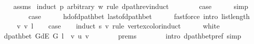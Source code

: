 \begin{isabellebody}
%
\isadelimproof
\ \ %
\endisadelimproof
%
\isatagproof
{}\isamarkupfalse%
\ assms\isanewline
{}\isamarkupfalse%
\ {\isacharparenleft}{\kern0pt}induct\ p\ arbitrary{\isacharcolon}{\kern0pt}\ w\ rule{\isacharcolon}{\kern0pt}\ dpath{\isacharunderscore}{\kern0pt}rev{\isacharunderscore}{\kern0pt}induct{\isacharparenright}{\kern0pt}\isanewline
\ \ \isamarkupfalse%
\ {}\isanewline
\ \ \isamarkupfalse%
\ {\isacharquery}{\kern0pt}case\isanewline
\ \ \ \ \isamarkupfalse%
\ simp\isanewline
{}\isamarkupfalse%
\isanewline
\ \ \isamarkupfalse%
\ {}\isanewline
\ \ \isamarkupfalse%
\ {\isacharquery}{\kern0pt}case\isanewline
\ \ \ \ \isamarkupfalse%
\ hd{\isacharunderscore}{\kern0pt}of{\isacharunderscore}{\kern0pt}dpath{\isacharunderscore}{\kern0pt}bet{\isacharprime}{\kern0pt}\ last{\isacharunderscore}{\kern0pt}of{\isacharunderscore}{\kern0pt}dpath{\isacharunderscore}{\kern0pt}bet\isanewline
\ \ \ \ \isamarkupfalse%
\ {\isacharparenleft}{\kern0pt}fastforce\ intro{\isacharcolon}{\kern0pt}\ list{\isacharunderscore}{\kern0pt}length{\isacharunderscore}{\kern0pt}{}{\isacharparenright}{\kern0pt}\isanewline
{}\isamarkupfalse%
\isanewline
\ \ \isamarkupfalse%
\ {\isacharparenleft}{\kern0pt}{}\ v\ v{\isacharprime}{\kern0pt}\ l{\isacharparenright}{\kern0pt}\isanewline
\ \ \isamarkupfalse%
\ {\isacharquery}{\kern0pt}case\isanewline
\ \ \isamarkupfalse%
\ {\isacharparenleft}{\kern0pt}induct\ s\ v\ rule{\isacharcolon}{\kern0pt}\ vertex{\isacharunderscore}{\kern0pt}color{\isacharunderscore}{\kern0pt}induct{\isacharparenright}{\kern0pt}\isanewline
\ \ \ \ \isamarkupfalse%
\ white\isanewline
\ \ \ \ \isamarkupfalse%
\ {\isachardoublequoteopen}dpath{\isacharunderscore}{\kern0pt}bet\ {\isacharparenleft}{\kern0pt}G{\isachardot}{\kern0pt}dE\ G{\isacharparenright}{\kern0pt}\ {\isacharparenleft}{\kern0pt}l\ {\isacharat}{\kern0pt}\ {\isacharbrackleft}{\kern0pt}v{\isacharbrackright}{\kern0pt}{\isacharparenright}{\kern0pt}\ u\ v{\isachardoublequoteclose}\isanewline
\ \ \ \ \ \ \isamarkupfalse%
\ {\isachardoublequoteopen}{}{\isachardot}{\kern0pt}prems{\isachardoublequoteclose}{\isacharparenleft}{\kern0pt}{}{\isacharparenright}{\kern0pt}\isanewline
\ \ \ \ \ \ \isamarkupfalse%
\ {\isacharparenleft}{\kern0pt}intro\ dpath{\isacharunderscore}{\kern0pt}bet{\isacharunderscore}{\kern0pt}pref{\isacharparenright}{\kern0pt}\ simp\isanewline

\end{isabellebody}
